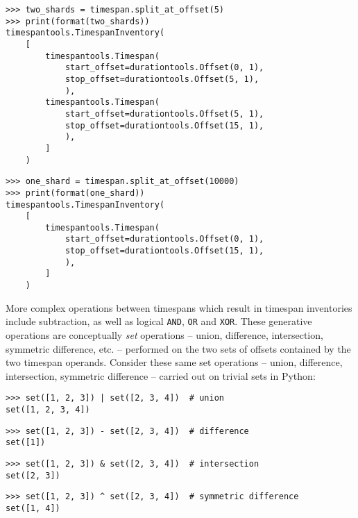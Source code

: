 \begin{singlespacing}
\vspace{-0.5\baselineskip}
\begin{lstlisting}
>>> two_shards = timespan.split_at_offset(5)
>>> print(format(two_shards))
timespantools.TimespanInventory(
    [
        timespantools.Timespan(
            start_offset=durationtools.Offset(0, 1),
            stop_offset=durationtools.Offset(5, 1),
            ),
        timespantools.Timespan(
            start_offset=durationtools.Offset(5, 1),
            stop_offset=durationtools.Offset(15, 1),
            ),
        ]
    )
\end{lstlisting}
\begin{lstlisting}
>>> one_shard = timespan.split_at_offset(10000)
>>> print(format(one_shard))
timespantools.TimespanInventory(
    [
        timespantools.Timespan(
            start_offset=durationtools.Offset(0, 1),
            stop_offset=durationtools.Offset(15, 1),
            ),
        ]
    )
\end{lstlisting}
\end{singlespacing}

\noindent More complex operations between timespans which result in timespan
inventories include subtraction, as well as logical \texttt{AND}, \texttt{OR}
and \texttt{XOR}. These generative operations are conceptually \emph{set}
operations -- union, difference, intersection, symmetric difference, etc. --
performed on the two sets of offsets contained by the two timespan operands.
Consider these same set operations -- union, difference, intersection,
symmetric difference -- carried out on trivial sets in Python:

\begin{comment}
<abjad>
set([1, 2, 3]) | set([2, 3, 4])  # union
set([1, 2, 3]) - set([2, 3, 4])  # difference
set([1, 2, 3]) & set([2, 3, 4])  # intersection
set([1, 2, 3]) ^ set([2, 3, 4])  # symmetric difference
</abjad>
\end{comment}

\begin{singlespacing}
\vspace{-0.5\baselineskip}
\begin{lstlisting}
>>> set([1, 2, 3]) | set([2, 3, 4])  # union
set([1, 2, 3, 4])
\end{lstlisting}
\begin{lstlisting}
>>> set([1, 2, 3]) - set([2, 3, 4])  # difference
set([1])
\end{lstlisting}
\begin{lstlisting}
>>> set([1, 2, 3]) & set([2, 3, 4])  # intersection
set([2, 3])
\end{lstlisting}
\begin{lstlisting}
>>> set([1, 2, 3]) ^ set([2, 3, 4])  # symmetric difference
set([1, 4])
\end{lstlisting}
\end{singlespacing}


